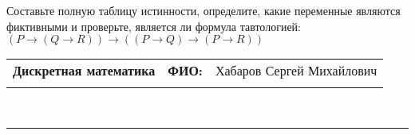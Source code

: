 \documentclass[10pt]{exam}
\newcommand{\class}{Дискретная математика}
\newcommand{\examdate}{}
\begin{document}
\begin{questions}
\begin{enumerate} [a)]
\end{enumerate}\question Составьте полную таблицу истинности, определите, какие переменные являются фиктивными и проверьте, является ли формула тавтологией:
$(P \rightarrow (Q \rightarrow R)) \rightarrow ((P \rightarrow Q) \rightarrow (P \rightarrow R))$

\end{questions}
\newpage
\begin{flushright}
\begin{tabular}{p{2.8in} r l}
\textbf{\class} & \textbf{ФИО:} &Хабаров Сергей Михайлович
\\

\textbf{\examdate} &&\\
\end{tabular}\\
\end{flushright}
\rule[1ex]{\textwidth}{.1pt}
\end{document}

